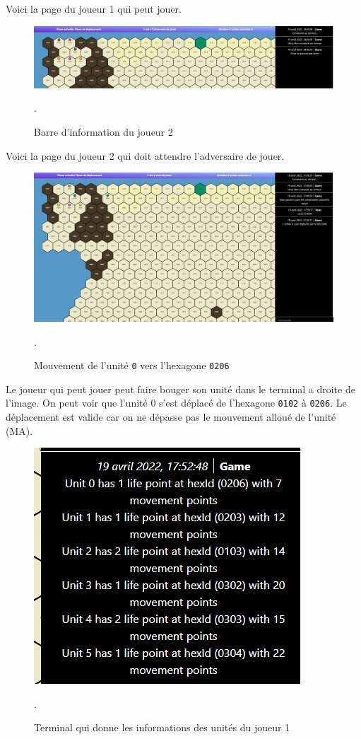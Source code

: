 Voici la page du joueur 1 qui peut jouer.\\

\begin{figure}[H]
\centering
\includegraphics[scale=0.35]{data/joueur_2.jpg}
\caption{Barre d'information du joueur 2}.
\end{figure}

Voici la page du joueur 2 qui doit attendre l'adversaire de jouer.

\begin{figure}[H]
\centering
\includegraphics[scale=0.35]{data/move_unit_player_1.jpg}
\caption{Mouvement de l'unité \lstinline{0} vers l'hexagone \lstinline{0206}}.
\end{figure}

Le joueur qui peut jouer peut faire bouger son unité dans le terminal a droite de l'image.
On peut voir que l'unité 0 s'est déplacé de l'hexagone \lstinline{0102} à \lstinline{0206}. Le déplacement est valide car on ne dépasse pas le mouvement alloué de l'unité (MA).\\

\begin{figure}[H]
\centering
\includegraphics[scale=0.6]{data/info_units.jpg}
\caption{Terminal qui donne les informations des unités du joueur 1 }.
\end{figure}


